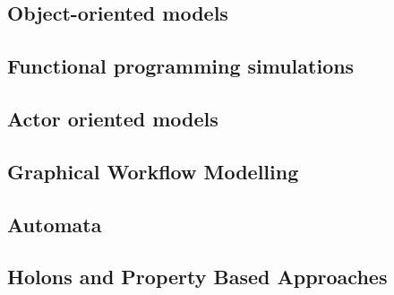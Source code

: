 \subsection{Object-oriented models}


\subsection{Functional programming simulations}


\subsection{Actor oriented models}



\subsection{Graphical Workflow Modelling}



\subsection{Automata}


\subsection{Holons and Property Based Approaches}



